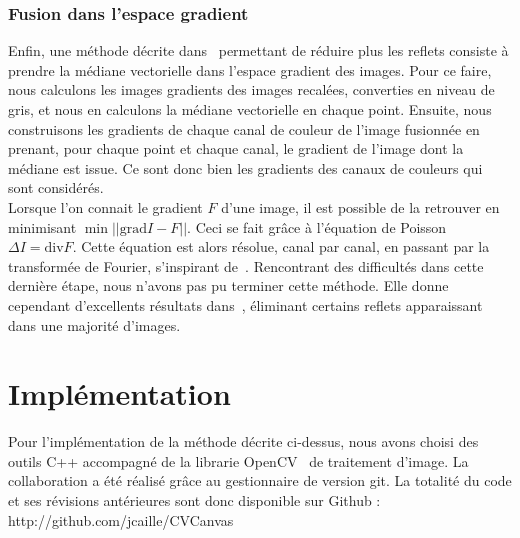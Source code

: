 \documentclass[12pt,a4paper]{article}
\begin{document}
\subsubsection{Fusion dans l'espace gradient}
Enfin, une méthode décrite dans~\citep{haro2012photographing} permettant de réduire plus les reflets consiste à prendre la médiane vectorielle dans l'espace gradient des images. Pour ce faire, nous calculons les images gradients des images recalées, converties en niveau de gris, et nous en calculons la médiane vectorielle en chaque point. Ensuite, nous construisons les gradients de chaque canal de couleur de l'image fusionnée en prenant, pour chaque point et chaque canal, le gradient de l'image dont la médiane est issue. Ce sont donc bien les gradients des canaux de couleurs qui sont considérés.\\
Lorsque l'on connait le gradient $F$ d'une image, il est possible de la retrouver en minimisant $\min||\mathrm{grad}I - F||$. Ceci se fait grâce à l'équation de Poisson $\Delta I = \mathrm{div}F$. Cette équation est alors résolue, canal par canal, en passant par la transformée de Fourier, s'inspirant de~\citep{morel2010pde}. Rencontrant des difficultés dans cette dernière étape, nous n'avons pas pu terminer cette méthode. Elle donne cependant d'excellents résultats dans~\citep{haro2012photographing}, éliminant certains reflets apparaissant dans une majorité d'images.
\section{Implémentation}

Pour l'implémentation de la méthode décrite ci-dessus, nous avons choisi des outils C++ accompagné de la librarie OpenCV~\citep{opencv_library} de traitement d'image. La collaboration a été réalisé grâce au gestionnaire de version git. La totalité du code et ses révisions antérieures sont donc disponible sur Github : http://github.com/jcaille/CVCanvas

\end{document}
